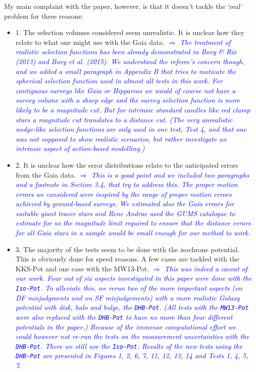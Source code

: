 \documentclass[10pt,a4paper]{article}
\newcommand{\Comment}[1]{\textsl{\textcolor{Blue}{$\Longrightarrow$ {#1}}}}
\begin{document}
My main complaint with the paper, however, is that it doesn't tackle the `real'
problem for three reasons:
\begin{itemize}
\item 1. The selection volumes considered seem unrealistic. It is unclear how they relate to what one might use with the Gaia data. \Comment{The treatment of realistic selection functions has been already demonstrated in Bovy \& Rix (2013) and Bovy et al. (2015). We understand the referee's concern though, and we added a small paragraph in Appendix B that tries to motivate the spherical selection function used in almost all tests in this work. For contiguous surveys like Gaia or Hipparcos we would of course not have a survey volume with a sharp edge and the survey selection function is more likely to be a magnitude cut. But for intrinsic standard candles like red clump stars a magnitude cut translates to a distance cut. (The very unrealistic wedge-like selection functions are only used in one test, Test 4, and that one was not supposed to show realistic scenarios, but rather investigate an intrinsic aspect of action-based modelling.)}\\
\item 2. It is unclear how the error distributions relate to the anticipated errors from the Gaia data. \Comment{This is a good point and we included two paragraphs and a footnote in Section 3.4, that try to address this. The proper motion errors we considered were inspired by the range of proper motion errors achieved by ground-based surveys. We estimated also the Gaia errors for suitable giant tracer stars and Rene Andrae used the GUMS catalogue to estimate for us the magnitude limit required to ensure that the distance errors for all Gaia stars in a sample would be small enough for our method to work.}
\item 3. The majority of the tests seem to be done with the isochrone potential. This is obviously done for speed reasons. A few cases are tackled with the KKS-Pot and one case with the MW13-Pot. \Comment{This was indeed a caveat of our work. Four out of six aspects investigated in this paper were done with the \texttt{Iso-Pot}. To alleviate this, we rerun two of the more important aspects (on DF misjudgments and on SF misjudgements) with a more realistic Galaxy potential with disk, halo and bulge, the \texttt{DHB-Pot}. (All tests with the \texttt{MW13-Pot} were also replaced with the \texttt{DHB-Pot} to have no more than four different potentials in the paper.) Because of the immense computational effort we could however not re-run the tests on the measurement uncertainties with the \texttt{DHB-Pot}. There we still use the \texttt{Iso-Pot}. Results of the new tests using the \texttt{DHB-Pot} are presented in Figures 1, 2, 6, 7, 11, 12, 13, 14 and Tests 1, 4, 5, 7.} \\

\end{itemize}
\end{document}
